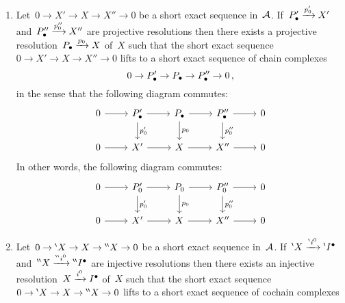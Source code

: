 \begin{lemma}
  \leavevmode
  \begin{enumerate}
    \item
      \label{projective horseshoe}
      Let~$0 \to X' \to X \to X'' \to 0$ be a short exact sequence in~$\mathcal{A}$.
      If~$P_\bullet' \xrightarrow{p'_0} X'$ and~$P_\bullet'' \xrightarrow{p''_0} X''$ are projective resolutions then there exists a projective resolution~$P_\bullet \xrightarrow{p_0} X$ of~$X$ such that the short exact sequence~$0 \to X' \to X \to X'' \to 0$ lifts to a short exact sequence of chain complexes
      \[
        0
        \to
        P_\bullet'
        \to
        P_\bullet
        \to
        P_\bullet''
        \to
        0 \,,
      \]
      in the sense that the following diagram commutes: 
      \[
        \begin{tikzcd}
            0
            \arrow{r}
          & \Pcc'
            \arrow{r}
            \arrow{d}[right]{p'_0}
          & \Pcc
            \arrow{r}
            \arrow{d}[right]{p_0}
          & \Pcc''
            \arrow{r}
            \arrow{d}[right]{p''_0}
          & 0
          \\
            0
            \arrow{r}
          & X'
            \arrow{r}
          & X
            \arrow{r}
          & X''
            \arrow{r}
          & 0
        \end{tikzcd}
      \]
      In other words, the following diagram commutes:
      \[
        \begin{tikzcd}
            0
            \arrow{r}
          & P'_0
            \arrow{r}
            \arrow{d}[right]{p'_0}
          & P_0
            \arrow{r}
            \arrow{d}[right]{p_0}
          & P''_0
            \arrow{r}
            \arrow{d}[right]{p''_0}
          & 0
          \\
            0
            \arrow{r}
          & X'
            \arrow{r}
          & X
            \arrow{r}
          & X''
            \arrow{r}
          & 0
        \end{tikzcd}
      \]
    \item
      \label{injective horseshoe}
      Let~$0 \to {}^{\backprime} X \to X \to {}^{\backprime \backprime} X \to 0$ be a short exact sequence in~$\mathcal{A}$.
      If~${}^{\backprime} X \xrightarrow{{}^{\backprime} i^0} {}^{\backprime}I^\bullet$ and~${}^{\backprime \backprime} X \xrightarrow{{}^{\backprime \backprime} i^0} {}^{\backprime \backprime}I^\bullet$ are injective resolutions then there exists an injective resolution~$X \xrightarrow{i^0} I^\bullet$ of~$X$ such that the short exact sequence~$0 \to {}^{\backprime} X \to X \to {}^{\backprime \backprime} X \to 0$ lifts to a short exact sequence of cochain complexes
      \[
\]
\end{enumerate}
\end{lemma}
